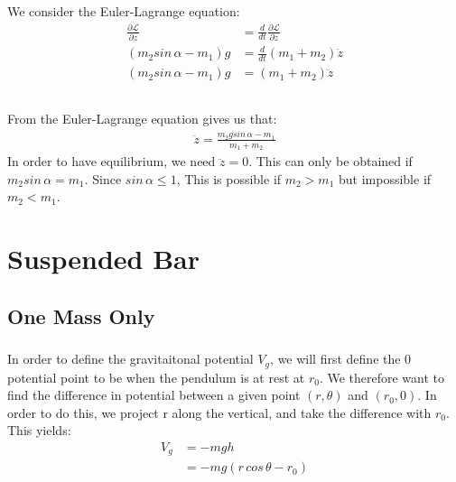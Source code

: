\documentclass{article}
\begin{document}
\subsection{} %

We consider the Euler-Lagrange equation:
\begin{align*}
	\frac{\partial \mathcal{L}}{\partial z} &= \frac{d}{dt}\frac{\partial \mathcal{L}}{\partial \dot{z}}\\
	 (m_2sin\,\alpha - m_1)g &= \frac{d}{dt}(m_1 + m_2)\dot{z}\\
	 (m_2sin\,\alpha - m_1)g &= (m_1 + m_2)\ddot{z}
\end{align*}

\subsection{} %

From the Euler-Lagrange equation gives us that:
\begin{align*}
	\ddot{z} = \frac{ m_2gsin\,\alpha  - m_1}{m_1 + m_2}
\end{align*}
In order to have equilibrium, we need $\ddot{z} = 0$. This can only be obtained if $m_2sin\,\alpha = m_1$. Since $sin\,\alpha \leq 1$, This is possible if $m_2 > m_1$ but impossible if $m_2 < m_1$.

\section{Suspended Bar}

\subsection{One Mass Only}

\subsubsection{} %

In order to define the gravitaitonal potential $V_g$, we will first define the 0 potential point to be when the pendulum is at rest at $r_0$. We therefore want to find the difference in potential between a given point $(r,\theta)$ and $(r_0,0)$. In order to do this, we project r along the vertical, and take the difference with $r_0$. This yields:
\begin{align*}
	V_g &= -mgh\\
	&= -mg(r\,cos\,\theta - r_0)
\end{align*}
\end{document}
